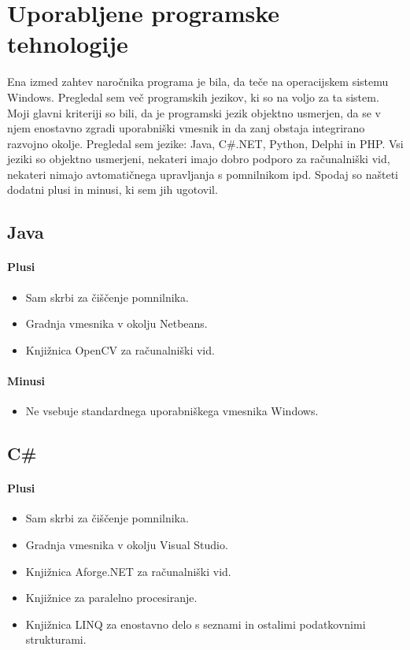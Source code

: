 \documentclass[oneside, a4paper, 12pt]{book}
\begin{document}
\section{Uporabljene programske tehnologije}
Ena izmed zahtev naročnika programa je bila, da teče na operacijskem sistemu Windows. Pregledal sem več programskih jezikov, ki so na voljo za ta sistem. Moji glavni kriteriji so bili, da je programski jezik objektno usmerjen, da se v njem enostavno zgradi uporabniški vmesnik in da zanj obstaja integrirano razvojno okolje. Pregledal sem jezike: Java, C\#.NET, Python, Delphi in PHP. Vsi jeziki so objektno usmerjeni, nekateri imajo dobro podporo za računalniški vid, nekateri nimajo avtomatičnega upravljanja s pomnilnikom ipd. Spodaj so našteti dodatni plusi in minusi, ki sem jih ugotovil.

\subsection{Java}
\paragraph{Plusi}
\begin{itemize}
\item Sam skrbi za čiščenje pomnilnika.
\item Gradnja vmesnika v okolju Netbeans.
\item Knjižnica OpenCV za računalniški vid.
\end{itemize}
\paragraph{Minusi}
\begin{itemize}
\item Ne vsebuje standardnega uporabniškega vmesnika Windows.
\end{itemize}

\subsection{C\#}
\paragraph{Plusi}
\begin{itemize}
\item Sam skrbi za čiščenje pomnilnika.
\item Gradnja vmesnika v okolju Visual Studio.
\item Knjižnica Aforge.NET za računalniški vid.
\item Knjižnice za paralelno procesiranje.
\item Knjižnica LINQ za enostavno delo s seznami in ostalimi podatkovnimi strukturami.
\end{itemize}
\end{document}
